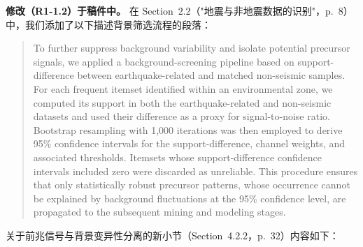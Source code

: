 \documentclass[12pt]{article}
\newcommand{\revchange}[1]{\begingroup\color{changecolor}#1\endgroup}
\begin{document}
\revchange{%
\textbf{修改（R1-1.2）于稿件中。}
在 Section~2.2（"地震与非地震数据的识别"，p.~8）中，我们添加了以下描述背景筛选流程的段落：

\begin{quote}
To further suppress background variability and isolate potential precursor signals, we applied a background-screening pipeline based on support-difference between earthquake-related and matched non-seismic samples. For each frequent itemset identified within an environmental zone, we computed its support in both the earthquake-related and non-seismic datasets and used their difference as a proxy for signal-to-noise ratio. Bootstrap resampling with 1,000 iterations was then employed to derive 95\% confidence intervals for the support-difference, channel weights, and associated thresholds. Itemsets whose support-difference confidence intervals included zero were discarded as unreliable. This procedure ensures that only statistically robust precursor patterns, whose occurrence cannot be explained by background fluctuations at the 95\% confidence level, are propagated to the subsequent mining and modeling stages.
	\end{quote}

	关于前兆信号与背景变异性分离的新小节（Section~4.2.2，p.~32）内容如下：

}
\end{document}
